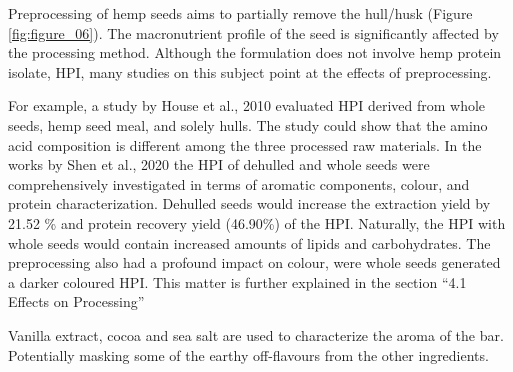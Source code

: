\vspace{1em}
Preprocessing of hemp seeds aims to partially remove the hull/husk (Figure \ref*{fig:figure_06}). The macronutrient profile of the seed is significantly affected by the processing method. Although the formulation does not involve hemp protein isolate, HPI, many studies on this subject point at the effects of preprocessing. 

\vspace{1em}
For example, a study by House et al., 2010 evaluated HPI derived from whole seeds, hemp seed meal, and solely hulls. The study could show that the amino acid composition is different among the three processed raw materials. In the works by Shen et al., 2020 the HPI of dehulled and whole seeds were comprehensively investigated in terms of aromatic components, colour, and protein characterization. Dehulled seeds would increase the extraction yield by 21.52 \% and protein recovery yield (46.90\%) of the HPI. Naturally, the HPI with whole seeds would contain increased amounts of lipids and carbohydrates. The preprocessing also had a profound impact on colour, were whole seeds generated a darker coloured HPI. This matter is further explained in the section “4.1 Effects on Processing”

\vspace{1em}
Vanilla extract, cocoa and sea salt are used to characterize the aroma of the bar. Potentially masking some of the earthy off-flavours from the other ingredients. 


